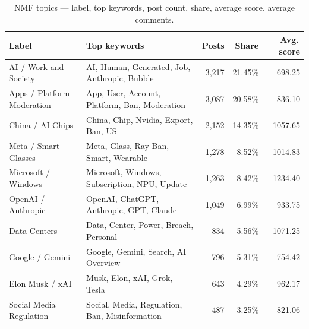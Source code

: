\documentclass[11pt,a4paper]{article}
\begin{document}
\begin{table}[H]
\centering
\small
\caption{NMF topics --- label, top keywords, post count, share, average score, average comments.}
\label{tab:nmf}
\renewcommand{\arraystretch}{1.15}
\begin{tabular}{p{3.4cm} p{6.0cm} r r r}
\toprule
\textbf{Label} & \textbf{Top keywords} & \textbf{Posts} & \textbf{Share} & \textbf{Avg.\,score} \\
\midrule
AI / Work and Society      & AI, Human, Generated, Job, Anthropic, Bubble    & 3{,}217 & 21.45\% & 698.25 \\
Apps / Platform Moderation & App, User, Account, Platform, Ban, Moderation  & 3{,}087 & 20.58\% & 836.10 \\
China / AI Chips           & China, Chip, Nvidia, Export, Ban, US           & 2{,}152 & 14.35\% & 1057.65 \\
Meta / Smart Glasses       & Meta, Glass, Ray-Ban, Smart, Wearable           & 1{,}278 & 8.52\%  & 1014.83 \\
Microsoft / Windows        & Microsoft, Windows, Subscription, NPU, Update   & 1{,}263 & 8.42\%  & 1234.40 \\
OpenAI / Anthropic         & OpenAI, ChatGPT, Anthropic, GPT, Claude         & 1{,}049 & 6.99\%  & 933.75 \\
Data Centers               & Data, Center, Power, Breach, Personal           & 834     & 5.56\%  & 1071.25 \\
Google / Gemini            & Google, Gemini, Search, AI Overview             & 796     & 5.31\%  & 754.42 \\
Elon Musk / xAI            & Musk, Elon, xAI, Grok, Tesla                    & 643     & 4.29\%  & 962.17 \\
Social Media Regulation    & Social, Media, Regulation, Ban, Misinformation  & 487     & 3.25\%  & 821.06 \\
\bottomrule
\end{tabular}
\end{table}
\end{document}

